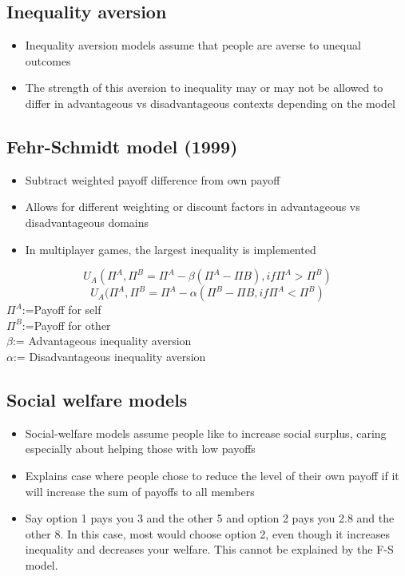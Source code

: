 \subsection{Inequality aversion}
\begin{itemize}
    \item Inequality aversion models assume that people are averse to unequal outcomes
    \item The strength of this aversion to inequality may or may not be allowed to differ in advantageous vs disadvantageous contexts depending on the model
\end{itemize} 
\subsection{Fehr-Schmidt model (1999)}
\begin{itemize}
    \item Subtract weighted payoff difference from own payoff
    \item Allows for different weighting or discount factors in advantageous vs disadvantageous domains
    \item In multiplayer games, the largest inequality is implemented
\end{itemize}
\[U_{A}(\Pi^{A}, \Pi^{B} = \Pi^{A} - \beta(\Pi^{A} - \Pi{B}), if \Pi^{A} > \Pi^{B})\]
\[U_{A}(\Pi^{A}, \Pi^{B} = \Pi^{A} - \alpha(\Pi^{B} - \Pi{B} ,  if \Pi^{A} < \Pi^{B})\]
$\Pi^{A}$:=Payoff for self
\\$\Pi^{B}$:=Payoff for other
\\$\beta$:= Advantageous inequality aversion
\\$\alpha$:= Disadvantageous inequality aversion

\subsection{Social welfare models}
\begin{itemize}
    \item Social-welfare models assume people like to increase social surplus, caring especially about helping those with low payoffs
    \item Explains case where people chose to reduce the level of their own payoff if it will increase the sum of payoffs to all members
    \item Say option 1 pays you 3 and the other 5 and option 2 pays you 2.8 and the other 8. In this case, most would choose option 2, even though  it increases inequality and decreases your welfare. This cannot be explained by the F-S model.
\end{itemize}
